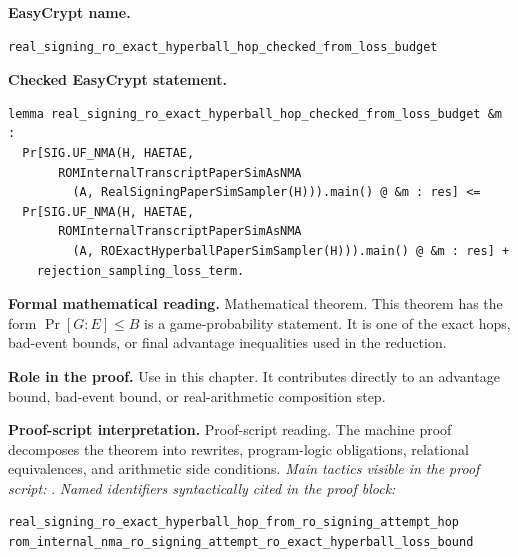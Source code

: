 \begin{formaltheorem}
\noindent\textbf{EasyCrypt name.}
\begin{lstlisting}[language=EasyCrypt,basicstyle=\ttfamily\scriptsize]
real_signing_ro_exact_hyperball_hop_checked_from_loss_budget
\end{lstlisting}
\noindent\textbf{Checked EasyCrypt statement.}
\begin{lstlisting}[language=EasyCrypt,basicstyle=\ttfamily\scriptsize]
lemma real_signing_ro_exact_hyperball_hop_checked_from_loss_budget &m :
  Pr[SIG.UF_NMA(H, HAETAE,
       ROMInternalTranscriptPaperSimAsNMA
         (A, RealSigningPaperSimSampler(H))).main() @ &m : res] <=
  Pr[SIG.UF_NMA(H, HAETAE,
       ROMInternalTranscriptPaperSimAsNMA
         (A, ROExactHyperballPaperSimSampler(H))).main() @ &m : res] +
    rejection_sampling_loss_term.
\end{lstlisting}
\noindent\textbf{Formal mathematical reading.}
Mathematical theorem. This theorem has the form \(\Pr[G:E] \le B\) is a game-probability statement.  It is one of the exact hops, bad-event bounds, or final advantage inequalities used in the reduction.

\noindent\textbf{Role in the proof.}
Use in this chapter. It contributes directly to an advantage bound, bad-event bound, or real-arithmetic composition step.

\noindent\textbf{Proof-script interpretation.}
Proof-script reading. The machine proof decomposes the theorem into rewrites, program-logic obligations, relational equivalences, and arithmetic side conditions.
\emph{Main tactics visible in the proof script:} .
\emph{Named identifiers syntactically cited in the proof block:}
\begin{lstlisting}[language=EasyCrypt,basicstyle=\ttfamily\scriptsize]
real_signing_ro_exact_hyperball_hop_from_ro_signing_attempt_hop
rom_internal_nma_ro_signing_attempt_ro_exact_hyperball_loss_bound
\end{lstlisting}

\end{formaltheorem}

